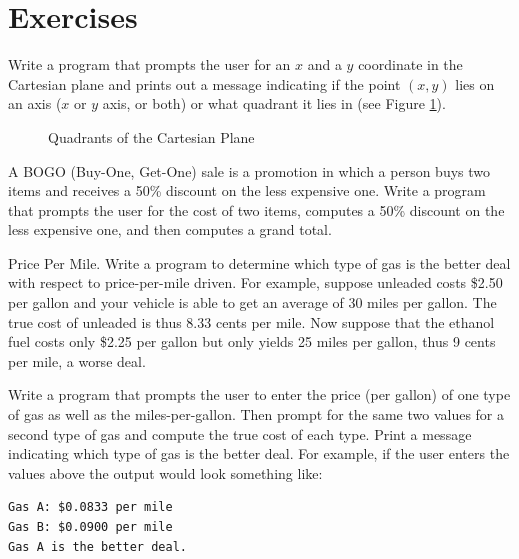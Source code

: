 

\section{Exercises}

\begin{exer}
Write a program that prompts the user for an $x$ and a $y$ coordinate 
in the Cartesian plane and prints out a message indicating if the point 
$(x,y)$ lies on an axis ($x$ or $y$ axis, or both) or what quadrant it lies 
in (see Figure \ref{fig:Quadrants}).

\begin{figure}[h]
  \centering
 
 \caption{Quadrants of the Cartesian Plane}
 \label{fig:Quadrants}
\end{figure}
\end{exer}

\begin{exer}
A BOGO (Buy-One, Get-One) sale is a promotion in which a person buys two
items and receives a 50\% discount on the less expensive one.  Write a program
that prompts the user for the cost of two items, computes a 50\% discount
on the less expensive one, and then computes a grand total.
\end{exer}

\begin{exer}
Price Per Mile.  Write a program to determine which type of gas is
the better deal with respect to price-per-mile driven.  For example, suppose
unleaded costs \$2.50 per gallon and your vehicle is able to get an average of
30 miles per gallon.  The true cost of unleaded is thus 8.33 cents per mile.
Now suppose that the ethanol fuel costs only \$2.25 per gallon but only yields
25 miles per gallon, thus 9 cents per mile, a worse deal.  

Write a program that prompts the user to enter the price (per gallon) of 
one type of gas as well as the miles-per-gallon.  Then prompt for the
same two values for a second type of gas and compute the true cost of
each type.  Print a message indicating which type of gas is the better
deal.  For example, if the user enters the values above the output would
look something like:

\begin{verbatim}
Gas A: $0.0833 per mile
Gas B: $0.0900 per mile
Gas A is the better deal.
\end{verbatim}
\end{exer}


